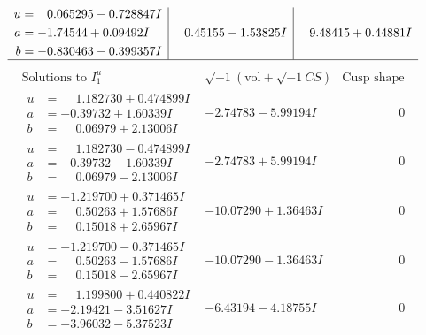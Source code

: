 \documentclass[1p]{elsarticle_modified}
\theoremstyle{definition}
\newcommand{\I}{\sqrt{-1}}
\begin{document}
$$\begin{array}{c|c|c}
\begin{aligned}
u &= \phantom{-}0.065295 - 0.728847 I \\
a &= -1.74544 + 0.09492 I \\
b &= -0.830463 - 0.399357 I\end{aligned}
 & \phantom{-}0.45155 - 1.53825 I & \phantom{-}9.48415 + 0.44881 I\\
 \hline 
 \end{array}$$\newpage$$\begin{array}{c|c|c}  
\text{Solutions to }I^u_{1}& \I (\text{vol} + \sqrt{-1}CS) & \text{Cusp shape}\\
 \hline 
\begin{aligned}
u &= \phantom{-}1.182730 + 0.474899 I \\
a &= -0.39732 + 1.60339 I \\
b &= \phantom{-}0.06979 + 2.13006 I\end{aligned}
 & -2.74783 - 5.99194 I & \phantom{-0.000000 } 0 \\ \hline\begin{aligned}
u &= \phantom{-}1.182730 - 0.474899 I \\
a &= -0.39732 - 1.60339 I \\
b &= \phantom{-}0.06979 - 2.13006 I\end{aligned}
 & -2.74783 + 5.99194 I & \phantom{-0.000000 } 0 \\ \hline\begin{aligned}
u &= -1.219700 + 0.371465 I \\
a &= \phantom{-}0.50263 + 1.57686 I \\
b &= \phantom{-}0.15018 + 2.65967 I\end{aligned}
 & -10.07290 + 1.36463 I & \phantom{-0.000000 } 0 \\ \hline\begin{aligned}
u &= -1.219700 - 0.371465 I \\
a &= \phantom{-}0.50263 - 1.57686 I \\
b &= \phantom{-}0.15018 - 2.65967 I\end{aligned}
 & -10.07290 - 1.36463 I & \phantom{-0.000000 } 0 \\ \hline\begin{aligned}
u &= \phantom{-}1.199800 + 0.440822 I \\
a &= -2.19421 - 3.51627 I \\
b &= -3.96032 - 5.37523 I\end{aligned}
 & -6.43194 - 4.18755 I & \phantom{-0.000000 } 0 \\ \hline\begin{aligned}

\end{aligned}
\end{array}$$
\end{document}
